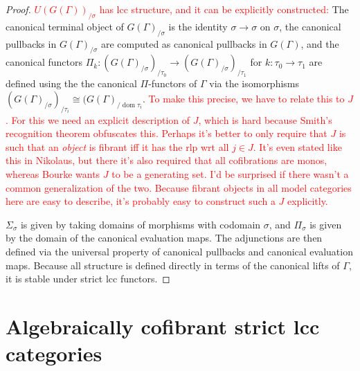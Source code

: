 \documentclass{article}
\newcommand{\todo}[1]{\textcolor{red}{#1}}
\theoremstyle{remark}
\theoremstyle{definition}
\begin{document}
\begin{proof}
  \todo{
    $U(G(\Gamma))_{/ \sigma}$ has lcc structure, and it can be explicitly constructed:
  }
  The canonical terminal object of $G(\Gamma)_{/ \sigma}$ is the identity $\sigma \rightarrow \sigma$ on $\sigma$, the canonical pullbacks in $G(\Gamma)_{/ \sigma}$ are computed as canonical pullbacks in $G(\Gamma)$, and the canonical functors $\Pi_k : (G(\Gamma)_{/ \sigma})_{/ \tau_0} \rightarrow (G(\Gamma)_{/ \sigma})_{/ \tau_1}$ for $k : \tau_0 \rightarrow \tau_1$ are defined using the the canonical $\Pi$-functors of $\Gamma$ via the isomorphisms $(G(\Gamma)_{/ \sigma})_{/ \tau_i} \cong (G(\Gamma)_{/ \operatorname{dom} \tau_i}$.
  \todo{
    To make this precise, we have to relate this to $J$.
    For this we need an explicit description of $J$, which is hard because Smith's recognition theorem obfuscates this.
    Perhaps it's better to only require that $J$ is such that an \emph{object} is fibrant iff it has the rlp wrt all $j \in J$.
    It's even stated like this in Nikolaus, but there it's also required that all cofibrations are monos, whereas Bourke wants $J$ to be a generating set.
    I'd be surprised if there wasn't a common generalization of the two.
    Because fibrant objects in all model categories here are easy to
    describe, it's probably easy to construct such a $J$ explicitly.
  }

  $\Sigma_\sigma$ is given by taking domains of morphisms with codomain $\sigma$, and $\Pi_\sigma$ is given by the domain of the canonical evaluation maps.
  The adjunctions are then defined via the universal property of canonical pullbacks and canonical evaluation maps.
  Because all structure is defined directly in terms of the canonical lifts of $\Gamma$, it is stable under strict lcc functors.
\end{proof}

\section{Algebraically cofibrant strict lcc categories}
\label{sec:algebraically-cofibrant}
\end{document}
